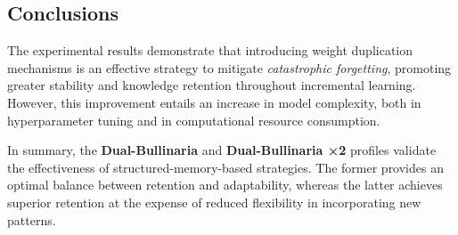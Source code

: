 \subsection{Conclusions}

The experimental results demonstrate that introducing weight duplication mechanisms is an effective strategy to mitigate \textit{catastrophic forgetting}, promoting greater stability and knowledge retention throughout incremental learning. However, this improvement entails an increase in model complexity, both in hyperparameter tuning and in computational resource consumption.

In summary, the \textbf{Dual-Bullinaria} and \textbf{Dual-Bullinaria ×2} profiles validate the effectiveness of structured-memory-based strategies. The former provides an optimal balance between retention and adaptability, whereas the latter achieves superior retention at the expense of reduced flexibility in incorporating new patterns.
